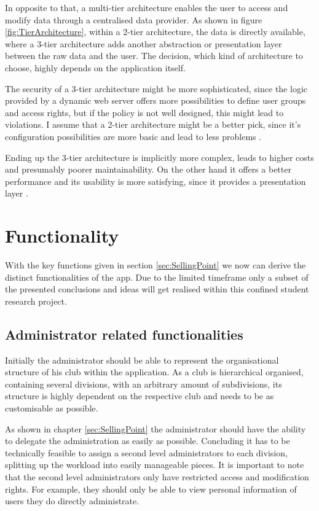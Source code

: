 In opposite to that, a multi-tier architecture enables the user to access and modify data through a centralised data provider. As shown in figure \vref{fig:TierArchitecture}, within a 2-tier architecture, the data is directly available, where a 3-tier architecture adds another abstraction or presentation layer between the raw data and the user. The decision, which kind of architecture to choose, highly depends on the application itself. 

The security of a 3-tier architecture might be more sophisticated, since the logic provided by a dynamic web server offers more possibilities to define user groups and access rights, but if the policy is not well designed, this might lead to violations. I assume that a 2-tier architecture might be a better pick, since it's configuration possibilities are more basic and lead to less problems \cite{Wright:2015aa}.

Ending up the 3-tier architecture is implicitly more complex, leads to higher costs and presumably poorer maintainability. On the other hand it offers a better performance and its usability is more satisfying, since it provides a presentation layer \cite{Wright:2015aa}.

\section{Functionality} %
\label{sec:Functionality}

With the key functions given in section \vref{sec:SellingPoint} we now can derive the distinct functionalities of the app. Due to the limited timeframe only a subset of the presented conclusions and ideas will get realised within this confined student research project.

\subsection{Administrator related functionalities}

Initially the administrator should be able to represent the organisational structure of his club within the application. As a club is hierarchical organised, containing several divisions, with an arbitrary amount of subdivisions, its structure is highly dependent on the respective club and needs to be as customisable as possible. 

As shown in chapter \vref{sec:SellingPoint} the administrator should have the ability to delegate the administration as easily as possible. Concluding it has to be technically feasible to assign a second level administrators to each division, splitting up the workload into easily manageable pieces. It is important to note that the second level administrators only have restricted access and modification rights. For example, they should only be able to view personal information of users they do directly administrate.


